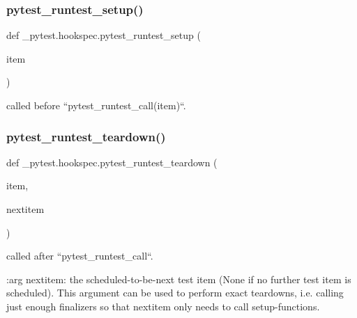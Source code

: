 \subsubsection{\texorpdfstring{pytest\+\_\+runtest\+\_\+setup()}{pytest\_runtest\_setup()}}
{\footnotesize\ttfamily def \+\_\+pytest.\+hookspec.\+pytest\+\_\+runtest\+\_\+setup (\begin{DoxyParamCaption}\item[{}]{item }\end{DoxyParamCaption})}

\begin{DoxyVerb}called before ``pytest_runtest_call(item)``. \end{DoxyVerb}
 \mbox{\label{namespace__pytest_1_1hookspec_aa72d91f2d5e025256584f91d01de408c}} 
\subsubsection{\texorpdfstring{pytest\+\_\+runtest\+\_\+teardown()}{pytest\_runtest\_teardown()}}
{\footnotesize\ttfamily def \+\_\+pytest.\+hookspec.\+pytest\+\_\+runtest\+\_\+teardown (\begin{DoxyParamCaption}\item[{}]{item,  }\item[{}]{nextitem }\end{DoxyParamCaption})}

\begin{DoxyVerb}called after ``pytest_runtest_call``.

:arg nextitem: the scheduled-to-be-next test item (None if no further
               test item is scheduled).  This argument can be used to
               perform exact teardowns, i.e. calling just enough finalizers
               so that nextitem only needs to call setup-functions.
\end{DoxyVerb}
 \mbox{\label{namespace__pytest_1_1hookspec_a4beffcba4a93819662741f442b2e1484}} 
